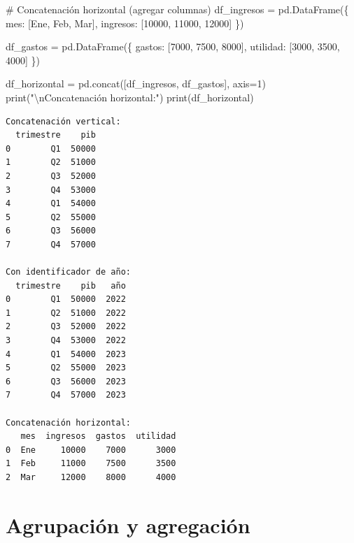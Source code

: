 \documentclass[
  doc,
  floatsintext,
  longtable,
  a4paper,
  nolmodern,
  notxfonts,
  notimes,
  12pt,
  colorlinks=true,linkcolor=blue,citecolor=blue,urlcolor=blue]{apa7}
\newenvironment{Shaded}{\begin{snugshade}}{\end{snugshade}}
\newcommand{\BuiltInTok}[1]{\textcolor[rgb]{0.00,0.23,0.31}{#1}}
\newcommand{\CharTok}[1]{\textcolor[rgb]{0.13,0.47,0.30}{#1}}
\newcommand{\CommentTok}[1]{\textcolor[rgb]{0.37,0.37,0.37}{#1}}
\newcommand{\DecValTok}[1]{\textcolor[rgb]{0.68,0.00,0.00}{#1}}
\newcommand{\NormalTok}[1]{\textcolor[rgb]{0.00,0.23,0.31}{#1}}
\newcommand{\OperatorTok}[1]{\textcolor[rgb]{0.37,0.37,0.37}{#1}}
\newcommand{\StringTok}[1]{\textcolor[rgb]{0.13,0.47,0.30}{#1}}
\begin{document}
\begin{Shaded}
\begin{Highlighting}[]
\CommentTok{\# Concatenación horizontal (agregar columnas)}
\NormalTok{df\_ingresos }\OperatorTok{=}\NormalTok{ pd.DataFrame(\{}
    \StringTok{\textquotesingle{}mes\textquotesingle{}}\NormalTok{: [}\StringTok{\textquotesingle{}Ene\textquotesingle{}}\NormalTok{, }\StringTok{\textquotesingle{}Feb\textquotesingle{}}\NormalTok{, }\StringTok{\textquotesingle{}Mar\textquotesingle{}}\NormalTok{],}
    \StringTok{\textquotesingle{}ingresos\textquotesingle{}}\NormalTok{: [}\DecValTok{10000}\NormalTok{, }\DecValTok{11000}\NormalTok{, }\DecValTok{12000}\NormalTok{]}
\NormalTok{\})}

\NormalTok{df\_gastos }\OperatorTok{=}\NormalTok{ pd.DataFrame(\{}
    \StringTok{\textquotesingle{}gastos\textquotesingle{}}\NormalTok{: [}\DecValTok{7000}\NormalTok{, }\DecValTok{7500}\NormalTok{, }\DecValTok{8000}\NormalTok{],}
    \StringTok{\textquotesingle{}utilidad\textquotesingle{}}\NormalTok{: [}\DecValTok{3000}\NormalTok{, }\DecValTok{3500}\NormalTok{, }\DecValTok{4000}\NormalTok{]}
\NormalTok{\})}

\NormalTok{df\_horizontal }\OperatorTok{=}\NormalTok{ pd.concat([df\_ingresos, df\_gastos], axis}\OperatorTok{=}\DecValTok{1}\NormalTok{)}
\BuiltInTok{print}\NormalTok{(}\StringTok{"}\CharTok{\textbackslash{}n}\StringTok{Concatenación horizontal:"}\NormalTok{)}
\BuiltInTok{print}\NormalTok{(df\_horizontal)}
\end{Highlighting}
\end{Shaded}

\begin{verbatim}
Concatenación vertical:
  trimestre    pib
0        Q1  50000
1        Q2  51000
2        Q3  52000
3        Q4  53000
4        Q1  54000
5        Q2  55000
6        Q3  56000
7        Q4  57000

Con identificador de año:
  trimestre    pib   año
0        Q1  50000  2022
1        Q2  51000  2022
2        Q3  52000  2022
3        Q4  53000  2022
4        Q1  54000  2023
5        Q2  55000  2023
6        Q3  56000  2023
7        Q4  57000  2023

Concatenación horizontal:
   mes  ingresos  gastos  utilidad
0  Ene     10000    7000      3000
1  Feb     11000    7500      3500
2  Mar     12000    8000      4000
\end{verbatim}

\section{Agrupación y agregación}\label{agrupaciuxf3n-y-agregaciuxf3n}
\end{document}
